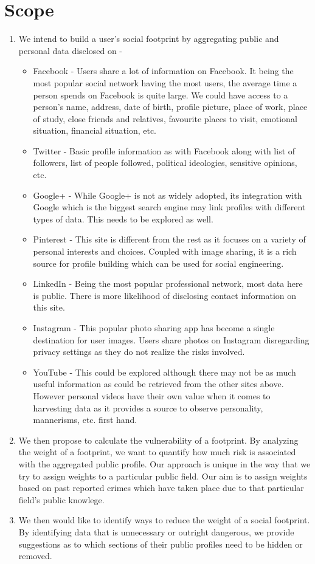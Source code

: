\documentclass[11pt]{article}
\begin{document}
\section{Scope}
\begin{enumerate}

\item We intend to build a user’s social footprint by aggregating public and personal data disclosed on - 
  \begin{itemize}
   \item Facebook - Users share a lot of information on Facebook. It being the most popular social network having the most users, the average time a person spends on Facebook is quite large. We could have access to a person’s name, address, date of birth, profile picture, place 	of work, place of study, close friends and relatives, favourite places to visit, emotional situation, financial situation, etc. 
   \item Twitter - Basic profile information as with Facebook along with list of followers, list of people followed, political ideologies, sensitive opinions, etc.
   \item Google+ - While Google+ is not as widely adopted, its integration with Google which is the biggest search engine may link profiles with different types of data. This needs to be explored as well.
   \item Pinterest - This site is different from the rest as it focuses on a variety of personal interests and choices. Coupled with image sharing, it is a rich source for profile building which can be used for social engineering.
   \item LinkedIn - Being the most popular professional network, most data here is public. There is more likelihood of disclosing contact information on this site.
   \item Instagram - This popular photo sharing app has become a single destination for user images. Users share photos on Instagram disregarding privacy settings as they do not realize the risks involved.
   \item YouTube - This could be explored although there may not be as much useful information as could be retrieved from the other sites above. However personal videos have their own value when it comes to harvesting data as it provides a source to observe personality, mannerisms, etc. first hand.
    \end{itemize}

\item We then propose to calculate the vulnerability of a footprint. By analyzing the weight of a footprint, we want to quantify how much risk is associated with the aggregated public profile. Our approach is unique in the way that we try to assign weights to a particular public field. Our aim is to assign weights based on past reported crimes which have taken place due to that particular field's public knowlege. 
\item We then would like to identify ways to reduce the weight of a social footprint. By identifying data that is unnecessary or outright dangerous, we provide suggestions as to which sections of their public profiles need to be hidden or removed.
\end{enumerate}
\end{document}
